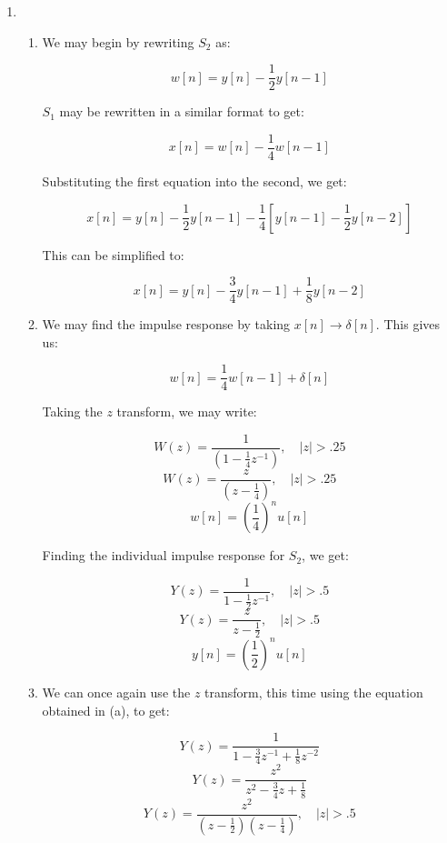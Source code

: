 \begin{enumerate}

  \item

    \begin{enumerate}

      \item 

        We may begin by rewriting $S_2$ as:

        $$w[n]=y[n]-\frac{1}{2}y[n-1]$$

        $S_1$ may be rewritten in a similar format to get:

        $$x[n]=w[n]-\frac{1}{4}w[n-1]$$

        Substituting the first equation into the second, we get:

        $$x[n]=y[n]-\frac{1}{2}y[n-1]-\frac{1}{4}\left[ y[n-1]-\frac{1}{2}y[n-2] \right]$$

        This can be simplified to:

        $$\boxed{x[n]=y[n]-\frac{3}{4}y[n-1]+\frac{1}{8}y[n-2]}$$

      \item 

        We may find the impulse response by taking $x[n]\to\delta[n]$. This gives us:

        $$w[n]=\frac{1}{4}w[n-1]+\delta[n]$$

        Taking the $z$ transform, we may write:

        $$W(z)=\frac{1}{\left( 1-\frac{1}{4}z^{-1} \right)},\quad |z|>.25$$
        $$W(z)=\frac{z}{\left( z-\frac{1}{4} \right)},\quad |z|>.25$$
        $$\boxed{w[n]=\left( \frac{1}{4} \right)^{n}u[n]}$$

        Finding the individual impulse response for $S_2$, we get:

        $$Y(z)=\frac{1}{1-\frac{1}{2}z^{-1}},\quad |z|>.5$$
        $$Y(z)=\frac{z}{z-\frac{1}{2}},\quad |z|>.5$$
        $$\boxed{y[n]=\left( \frac{1}{2} \right)^nu[n]}$$

      \item 

        We can once again use the $z$ transform, this time using the equation obtained in (a), to get:

        $$Y(z)=\frac{1}{1-\frac{3}{4}z^{-1}+\frac{1}{8}z^{-2}}$$
        $$Y(z)=\frac{z^2}{z^2-\frac{3}{4}z+\frac{1}{8}}$$
        $$Y(z)=\frac{z^2}{\left( z-\frac{1}{2} \right)\left( z-\frac{1}{4} \right)},\quad |z|>.5$$


\end{enumerate}
\end{enumerate}
